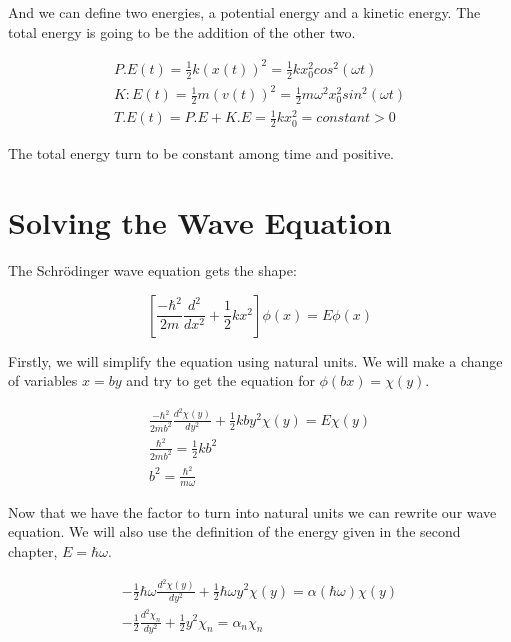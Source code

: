 And we can define two energies, a potential energy and a kinetic energy. The total energy is going to be the addition of the other two.

\begin{equation}
  \begin{array}{c}
    P.E(t) = \frac{1}{2} k (x(t))^2 = \frac{1}{2} k x_0^2 cos^2(\omega t)
    \\
    K:E(t) = \frac{1}{2} m (v(t))^2 = \frac{1}{2} m \omega^2 x_0^2 sin^2(\omega t)
    \\
    T.E(t) = P.E + K.E = \frac{1}{2} k x_0^2 = constant > 0
  \end{array}
\end{equation}

The total energy turn to be constant among time and positive.

\section{Solving the Wave Equation}

The Schrödinger wave equation gets the shape:

\begin{equation}
  \left[\frac{-\hbar^2}{2m}\frac{d^2}{dx^2}+\frac{1}{2}kx^2\right]\phi(x) = E \phi(x)
\end{equation}

Firstly, we will simplify the equation using natural units. We will make a change of variables $x=by$ and try to get the equation for $\phi(bx)=\chi(y)$.

\begin{equation}
  \begin{array}{c}
    \frac{-\hbar^2}{2mb^2}\frac{d^2\chi(y)}{dy^2}+\frac{1}{2}kby^2\chi(y) = E\chi(y)
    \\
    \frac{\hbar^2}{2mb^2} = \frac{1}{2}k b^2
    \\
    b^2 = \frac{\hbar^2}{m\omega}
  \end{array}
\end{equation}

Now that we have the factor to turn into natural units we can rewrite our wave equation. We will also use the definition of the energy given in the second chapter, $E=\hbar \omega$.

\begin{equation}
  \begin{array}{c}
    -\frac{1}{2}\hbar \omega \frac{d^2\chi(y)}{dy^2} + \frac{1}{2} \hbar \omega y^2 \chi(y) = \alpha(\hbar\omega)\chi(y)
    \\
    -\frac{1}{2}\frac{d^2\chi_n}{dy^2}+\frac{1}{2}y^2\chi_n = \alpha_n \chi_n
  \end{array}
\end{equation}

